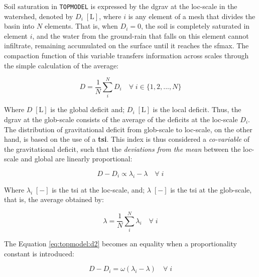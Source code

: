 \documentclass[./main_en.tex]{subfiles}
\begin{document}
\par Soil saturation in \texttt{TOPMODEL} is expressed by the \gls{dgrav} at the \gls{loc-scale} in the watershed, denoted by $D_{i} \; [\text{L}]$, where $i$ is any element of a mesh that divides the basin into $N$ elements. That is, when $D_{i} = 0$, the soil is completely saturated in element $i$, and the water from the \gls{ground-rain} that falls on this element cannot infiltrate, remaining accumulated on the surface until it reaches the \gls{sfmax}. The compaction function of this variable transfers information across scales through the simple calculation of the average:
\begin{linenomath*}
\begin{equation}
\label{eq:topmodel:d1}
D = \frac{1}{N} \sum^{N}_{i} D_{i} \quad  \forall \; i \in \{ 1, 2, ..., N\}
\end{equation}
\end{linenomath*}
Where $D \; [\text{L}]$ is the global deficit and; $D_{i} \; [\text{L}]$ is the local deficit. Thus, the \gls{dgrav} at the \gls{glob-scale} consists of the average of the deficits at the \gls{loc-scale} $D_{i}$. The distribution of gravitational deficit from \gls{glob-scale} to \gls{loc-scale}, on the other hand, is based on the use of a \textbf{\gls{tsi}}. This index is thus considered a \textit{co-variable} of the gravitational deficit, such that the \textit{deviations from the mean} between the \gls{loc-scale} and global are linearly proportional:
\begin{linenomath*}
\begin{equation}
\label{eq:topmodel:d2}
D - D_{i}  \propto \lambda_{i} - \lambda  \quad \forall \; i
\end{equation}
\end{linenomath*}
Where $\lambda_{i}\; [-]$ is the \gls{tsi} at the \gls{loc-scale}, and; $\lambda \; [-]$ is the \gls{tsi} at the \gls{glob-scale}, that is, the average obtained by:
\begin{linenomath*}
\begin{equation}
\label{eq:topmodel:d3}
\lambda = \frac{1}{N} \sum^{N}_{i} \lambda_{i} \quad  \forall \; i 
\end{equation}
\end{linenomath*}
The Equation \eqref{eq:topmodel:d2} becomes an equality when a proportionality constant is introduced:
\begin{linenomath*}
\begin{equation}
\label{eq:topmodel:d4}
D - D_{i}  = \omega (\lambda_{i} - \lambda ) \quad \forall \; i
\end{equation}
\end{linenomath*}
\end{document}
